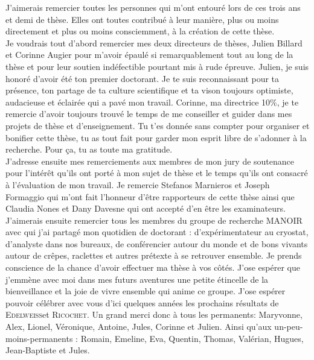\documentclass[
11pt, %
english, %
singlespacing, %
headsepline, %
]{MastersDoctoralThesis} %
\newcommand{\Ricochet}{\textsc{Ricochet}}
\newcommand{\Edelweiss}{\textsc{Edelweiss}}
\begin{document}
\begin{acknowledgements}
\addchaptertocentry{\acknowledgementname} %

J’aimerais remercier toutes les personnes qui m’ont entouré lors de ces trois ans et demi de thèse. Elles ont toutes contribué à leur manière, plus ou moins directement et plus ou moins consciemment, à la création de cette thèse.  
\\

 Je voudrais tout d’abord remercier mes deux directeurs de thèses, Julien Billard et Corinne Augier pour m’avoir épaulé si remarquablement tout au long de la thèse et pour leur soutien indéfectible pourtant mis à rude épreuve. Julien, je suis honoré d’avoir été ton premier doctorant. Je te suis reconnaissant pour ta présence, ton partage de ta culture scientifique et ta vison toujours optimiste, audacieuse et éclairée qui a pavé mon travail. Corinne, ma directrice 10\%, je te remercie d’avoir toujours trouvé le temps de me conseiller et guider dans mes projets de thèse et d’enseignement. Tu t’es donnée sans compter pour organiser et bonifier cette thèse, tu as tout fait pour garder mon esprit libre de s’adonner à la recherche. Pour ça, tu as toute ma gratitude.
\\

J’adresse ensuite mes remerciements aux membres de mon jury de soutenance pour l’intérêt qu’ils ont porté à mon sujet de thèse et le temps qu’ils ont consacré à l’évaluation de mon travail. Je remercie  Stefanos Marnieros et Joseph Formaggio qui m’ont fait l’honneur d’être rapporteurs de cette thèse ainsi que Claudia Nones et Dany Davesne qui ont accepté d’en être les examinateurs.
\\

J’aimerais ensuite remercier tous les membres du groupe de recherche MANOIR avec qui j’ai partagé mon quotidien de doctorant : d’expérimentateur au cryostat, d’analyste dans nos bureaux, de conférencier autour du monde et de bons vivants autour de crêpes, raclettes et autres prétexte à se retrouver ensemble. Je prends conscience de la chance d’avoir effectuer ma thèse à vos côtés. J’ose espérer que j’emmène avec moi dans mes futurs aventures une petite étincelle de la bienveillance et la joie de vivre ensemble qui anime ce groupe. J’ose espérer pouvoir célébrer avec vous d’ici quelques années les prochains résultats de \Edelweiss et \Ricochet. Un grand merci donc à tous les permanents: Maryvonne, Alex, Lionel, Véronique, Antoine, Jules, Corinne et Julien. Ainsi qu’aux un-peu-moins-permanents : Romain, Emeline, Eva, Quentin, Thomas, Valérian, Hugues, Jean-Baptiste et Jules.
\\


\end{acknowledgements}
\end{document}
